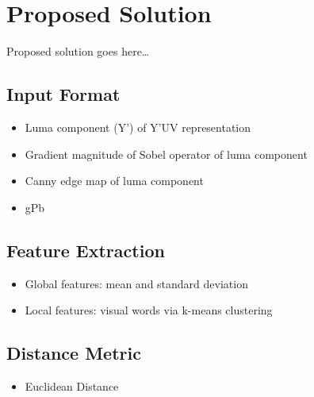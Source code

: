 \chapter{Proposed Solution}\label{ch:solution}
Proposed solution goes here\dots

\section{Input Format}
\begin{itemize}
    \item Luma component (Y') of Y'UV representation
    \item Gradient magnitude of Sobel operator of luma component
    \item Canny edge map of luma component
    \item gPb
\end{itemize}

\section{Feature Extraction}
\begin{itemize}
    \item Global features: mean and standard deviation
    \item Local features: visual words via k-means clustering
\end{itemize}

\section{Distance Metric}
\begin{itemize}
    \item Euclidean Distance
\end{itemize}

